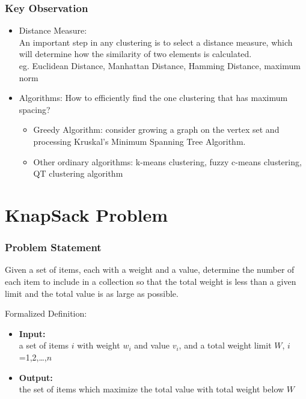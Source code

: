 \documentclass[slidestop,compress,mathserif]{beamer}
\begin{document}
\frame
{
\frametitle{Key Observation}
\begin{itemize}
	\item Distance Measure:\\
		    An important step in any clustering is to select a distance measure, which will determine how the similarity of two elements is calculated.\\
		eg. Euclidean Distance, Manhattan Distance, Hamming Distance, maximum norm
	\item Algorithms: How to efficiently find the one clustering that has maximum spacing?
		\begin{itemize}
			\item Greedy Algorithm: consider growing a graph on the vertex set and processing Kruskal's Minimum Spanning Tree Algorithm.
			\item Other ordinary algorithms: k-means clustering, fuzzy c-means clustering, QT clustering algorithm
		\end{itemize}
\end{itemize}
}

\section{KnapSack Problem}
\frame
{
\frametitle{Problem Statement}
Given a set of items, each with a weight and a value, determine the number of each item to include in a collection so that the total weight is less than a given limit and the total value is as large as possible.
\begin{block}{Formalized Definition:}
\begin{itemize}
    \item {\bf Input:}\\ a set of items $i$ with weight $w_i$ and value $v_i$, and a total weight limit $W$, $i$=1,2,\ldots,$n$
	\item {\bf Output:}\\ the set of items which maximize the total value with total weight below $W$
\end{itemize}
\end{block}
}
\end{document}
